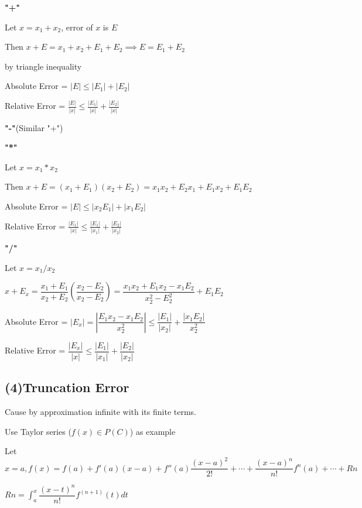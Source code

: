 \textbf{"+"}
\begin{tcolorbox}
	Let $x = x_1 + x_2$, error of $x$ is $E$
	
	Then $x+E = x_1 + x_2 + E_1 + E_2 \implies E = E_1 + E_2$
	
	by triangle inequality
	
	Absolute Error = $|E| \leq |E_1|+|E_2|$
	
	Relative Error = $\frac{|E|}{|x|} \leq \frac{|E_1|}{|x|} + \frac{|E_2|}{|x|}$
\end{tcolorbox}

\textbf{"-"}(Similar "+")\\

\newpage

\textbf{"*"}
\begin{tcolorbox}
Let $x = x_1 * x_2$

Then $x + E = (x_1 + E_1)(x_2 + E_2) = x_1x_2 + E_2x_1 + E_1x_2 + E_1E_2$

Absolute Error = $|E| \leq |x_2E_1|+|x_1E_2|$

Relative Error = $\frac{|E_1|}{|x|}  \leq \frac{|E_1|}{|x_1|} + \frac{|E_2|}{|x_2|}$

\end{tcolorbox}

\textbf{"/"}
\begin{tcolorbox}
	Let $x = x_1 /x_2$
	
	$x + E_x = \dfrac{x_1+E_1}{x_2+E_2}\left( \dfrac{x_2 - E_2}{x_2 - E_2}\right) = \dfrac{x_1x_2 + E_1x_2 - x_1E_2}{x_2^2 - E_2^2} + E_1E_2$
	
	Absolute Error = $|E_x| = |\dfrac{E_1x_2 - x_1E_2}{x_2^2}| \leq \dfrac{|E_1|}{|x_2|}+\dfrac{|x_1E_2|}{x_2^2}$
	
	Relative Error = $\dfrac{|E_x|}{|x|} \leq \dfrac{|E_1|}{|x_1 |} + \dfrac{|E_2|}{|x_2|}$
\end{tcolorbox}

\subsection*{(4)Truncation Error}

Cause by approximation infinite with its finite terms.

Use Taylor series ($f(x) \in P(C)$) as example

Let $x = a, f(x) = f(a)+f'(a)(x-a) + f''(a)\dfrac{(x-a)^2}{2!} + \cdots + \dfrac{(x-a)^n}{n!}f^{n}(a)+\cdots + Rn$

$Rn = \int^x_a\dfrac{(x-t)^n}{n!}f^{(n+1)}(t)dt$

